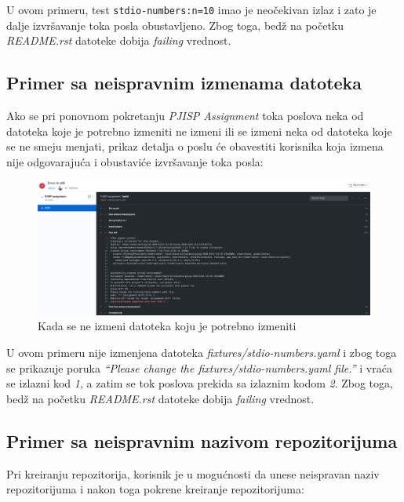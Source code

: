 \documentclass[12pt]{report}
\begin{document}
U ovom primeru, test \texttt{stdio-numbers:n=10} imao je neočekivan izlaz i zato je dalje izvršavanje toka posla obustavljeno. Zbog toga, bedž na početku \textit{README.rst} datoteke dobija \textit{failing} vrednost.

\subsection{Primer sa neispravnim izmenama datoteka}

Ako se pri ponovnom pokretanju \textit{PJISP Assignment} toka poslova neka od datoteka koje je potrebno izmeniti ne izmeni ili se izmeni neka od datoteka koje se ne smeju menjati, prikaz detalja o poslu će obavestiti korisnika koja izmena nije odgovarajuća i obustaviće izvršavanje toka posla:

\begin{figure}[H]
    \centering
    \includegraphics[width=\linewidth]{images/16.png}
    \caption{Kada se ne izmeni datoteka koju je potrebno izmeniti}
\end{figure}

U ovom primeru nije izmenjena datoteka \textit{fixtures/stdio-numbers.yaml} i zbog toga se prikazuje poruka \textit{``Please change the fixtures/stdio-numbers.yaml file.''} i vraća se izlazni kod \textit{1}, a zatim se tok poslova prekida sa izlaznim kodom \textit{2}. Zbog toga, bedž na početku \textit{README.rst} datoteke dobija \textit{failing} vrednost.

\subsection{Primer sa neispravnim nazivom repozitorijuma}

Pri kreiranju repozitorija, korisnik je u mogućnosti da unese neispravan naziv repozitorijuma i nakon toga pokrene kreiranje repozitorijuma:
\end{document}
